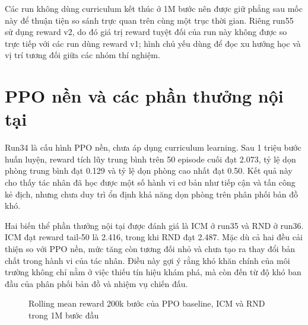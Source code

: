 Các run không dùng curriculum kết thúc ở 1M bước nên được giữ phẳng sau mốc này để thuận tiện so sánh trực quan trên cùng một trục thời gian. Riêng run55 sử dụng reward v2, do đó giá trị reward tuyệt đối của run này không được so trực tiếp với các run dùng reward v1; hình chủ yếu dùng để đọc xu hướng học và vị trí tương đối giữa các nhóm thí nghiệm.

\section{PPO nền và các phần thưởng nội tại}

Run34 là cấu hình PPO nền, chưa áp dụng curriculum learning. Sau 1 triệu bước huấn luyện, reward tích lũy trung bình trên 50 episode cuối đạt 2.073, tỷ lệ dọn phòng trung bình đạt 0.129 và tỷ lệ dọn phòng cao nhất đạt 0.50. Kết quả này cho thấy tác nhân đã học được một số hành vi cơ bản như tiếp cận và tấn công kẻ địch, nhưng chưa duy trì ổn định khả năng dọn phòng trên phân phối bản đồ khó.

Hai biến thể phần thưởng nội tại được đánh giá là ICM ở run35 và RND ở run36. ICM đạt reward tail-50 là 2.416, trong khi RND đạt 2.487. Mặc dù cả hai đều cải thiện so với PPO nền, mức tăng còn tương đối nhỏ và chưa tạo ra thay đổi bản chất trong hành vi của tác nhân. Điều này gợi ý rằng khó khăn chính của môi trường không chỉ nằm ở việc thiếu tín hiệu khám phá, mà còn đến từ độ khó ban đầu của phân phối bản đồ và nhiệm vụ chiến đấu.

\begin{figure}[H]
    \centering
    \caption{Rolling mean reward 200k bước của PPO baseline, ICM và RND trong 1M bước đầu}
    \label{fig:baseline_intrinsic_reward}
\end{figure}

